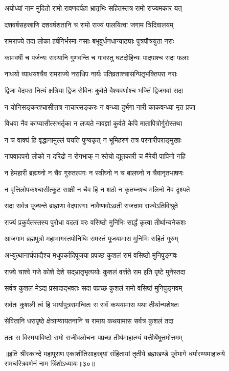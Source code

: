 \twolineshloka
{अयोध्यां नाम मुदितो रामो रावणदर्पहा}
{भ्रातृभिः सहितस्तत्र रामो राज्यमकार यत्}%

\twolineshloka
{दशवर्षसहस्राणि दशवर्षशतानि च}
{रामो राज्यं पालयित्वा जगाम त्रिदिवालयम्}%

\twolineshloka
{रामराज्ये तदा लोका हर्षनिर्भरमा नसाः}
{बभूवुर्धनधान्याढ्याः पुत्रपौत्रयुता नराः}%

\twolineshloka
{कामवर्षी च पर्जन्यः सस्यानि गुणवन्ति च}
{गावस्तु घटदोहिन्यः पादपाश्च सदा फलाः}%

\twolineshloka
{नाधयो व्याधयश्चैव रामराज्ये नराधिप}
{नार्यः पतिव्रताश्चासन्पितृभक्तिपरा नराः}%

\twolineshloka
{द्विजा वेदपरा नित्यं क्षत्रिया द्विज सेविनः}
{कुर्वते वैश्यवर्णाश्च भक्तिं द्विजगवां सदा}%

\twolineshloka
{न योनिसङ्करश्चासीत्तत्र नाचारसङ्करः}
{न वन्ध्या दुर्भगा नारी काकवन्ध्या मृत प्रजा}%

\twolineshloka
{विधवा नैव काप्यासीत्सभर्तृका न लप्यते}
{नावज्ञां कुर्वते केपि मातापित्रोर्गुरोस्तथा}%

\twolineshloka
{न च वाक्यं हि वृद्धानामुल्लं घयति पुण्यकृत्}
{न भूमिहरणं तत्र परनारीपराङ्मुखाः}%

\twolineshloka
{नापवादपरो लोको न दरिद्रो न रोगभाक्}
{न स्तेयो द्यूतकारी च मैरेयी पापिनो नहि}%

\twolineshloka
{न हेमहारी ब्रह्मघ्नो न चैव गुरुतल्पगः}
{न स्त्रीघ्नो न च बालघ्नो न चैवानृतभाषणः}%

\twolineshloka
{न वृत्तिलोपकश्चासीत्कूट साक्षी न चैव हि}
{न शठो न कृतघ्नश्च मलिनो नैव दृश्यते}%

\twolineshloka
{सदा सर्वत्र पूज्यन्ते ब्राह्मणा वेदपारगाः}
{नावैष्णवोऽव्रती राजन्राम राज्येऽतिविश्रुते}%

\twolineshloka
{राज्यं प्रकुर्वतस्तस्य पुरोधा वदतां वरः}
{वसिष्ठो मुनिभिः सार्द्धं कृत्वा तीर्थान्यनेकशः}%

\twolineshloka
{आजगाम ब्रह्मपुत्रो महाभागस्तपोनिधिः}
{रामस्तं पूजयामास मुनिभिः सहितं गुरुम्}%

\twolineshloka
{अभ्युत्थानार्घपाद्यैश्च मधुपर्कादिपूजया}
{प्रपच्छ कुशलं रामं वसिष्ठो मुनिपुङ्गवः}%

\twolineshloka
{राज्ये चाश्वे गजे कोशे देशे सद्भ्रातृभृत्ययोः}
{कुशलं वर्त्तते राम इति पृष्टे मुनेस्तदा}%


\twolineshloka
{सर्वत्र कुशलं मेऽद्य प्रसादाद्भवतः सदा}
{पप्रच्छ कुशलं रामो वसिष्ठं मुनिपुङ्गवम्}%

\twolineshloka
{सर्वतः कुशली त्वं हि भार्यापुत्रसमन्वितः}
{स सर्वं कथयामास यथा तीर्थान्यशेषतः}%

\twolineshloka
{सेवितानि धरापृष्ठे क्षेत्राण्यायतनानि च}
{रामाय कथयामास सर्वत्र कुशलं तदा}%

\twolineshloka
{ततः स विस्मयाविष्टो रामो राजीवलोचनः}
{पप्रच्छ तीर्थमाहात्म्यं यत्तीर्थेषूत्तमोत्तमम्}%

॥इति श्रीस्कान्दे महापुराण एकाशीतिसाहस्र्यां संहितायां तृतीये ब्रह्मखण्डे पूर्वभागे धर्मारण्यमाहात्म्ये रामचरित्रवर्णनं नाम त्रिंशोऽध्यायः॥३०॥
